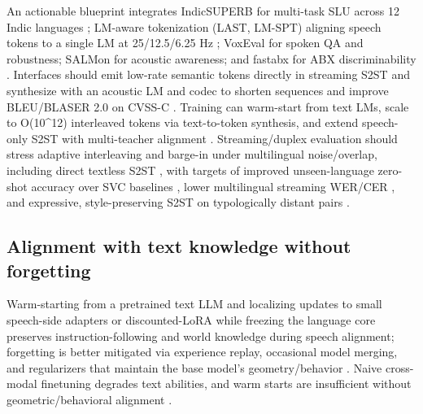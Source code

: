 \documentclass{article}
\begin{document}
An actionable blueprint integrates IndicSUPERB for multi-task SLU across 12 Indic languages \cite{entry2025indicsuperbspeechprocessinguniversalperf}; LM-aware tokenization (LAST, LM-SPT) aligning speech tokens to a single LM at 25/12.5/6.25 Hz \cite{turetzky2024lastlanguagemodelawarespeechtokenization,jo2025lmsptalignedsemanticdistillationspeechto}; VoxEval for spoken QA and robustness; SALMon for acoustic awareness; and fastabx for ABX discriminability \cite{cui2025voxevalbenchmarkingknowledgeunderstandin,maimon2025salmonsuiteacousticlanguagemodelevaluati,poli2025fastabxlibraryefficientcomputationabxdis}. Interfaces should emit low-rate semantic tokens directly in streaming S2ST and synthesize with an acoustic LM and codec to shorten sequences and improve BLEU/BLASER 2.0 on CVSS-C \cite{zhao2024textlessstreamingspeechtranslationsemant,jo2025lmsptalignedsemanticdistillationspeechto}. Training can warm-start from text LMs, scale to O(10^{12}) interleaved tokens via text-to-token synthesis, and extend speech-only S2ST with multi-teacher alignment \cite{hassid2024textuallypretrainedspeechlanguagemodels,turetzky2024lastlanguagemodelawarespeechtokenization,zeng2024scalingspeechtextpretrainingsyntheticint}. Streaming/duplex evaluation should stress adaptive interleaving and barge-in under multilingual noise/overlap, including direct textless S2ST \cite{hu2025salmduplexefficientdirectmodelingspeechl,zhao2024textlessstreamingspeechtranslationsemant,wang2023slmbridgethingapbetweenspeechtextfoundat}, with targets of improved unseen-language zero-shot accuracy over SVC baselines \cite{hsu2024exploringcontextlearningtextlessspeechla}, lower multilingual streaming WER/CER \cite{li2025transsionmultilingualspeechrecognitionsy}, and expressive, style-preserving S2ST on typologically distant pairs \cite{huang2023holisticcascadesystembenchmarkhumanevalu}.

\subsection{Alignment with text knowledge without forgetting} \label{subsec:Alignment with text knowledge without forgetting}

Warm-starting from a pretrained text LLM and localizing updates to small speech-side adapters or discounted-LoRA while freezing the language core preserves instruction-following and world knowledge during speech alignment; forgetting is better mitigated via experience replay, occasional model merging, and regularizers that maintain the base model's geometry/behavior \cite{hsiao2025analyzingmitigationstrategiescatastrophi,hassid2024textuallypretrainedspeechlanguagemodels,lu2024destaenhancingspeechlanguagemodelsthroug,wang2023slmbridgethingapbetweenspeechtextfoundat}. Naive cross-modal finetuning degrades text abilities, and warm starts are insufficient without geometric/behavioral alignment \cite{peng2024mslms2stmultitaskspeechlanguagemodeltext}.
\end{document}
